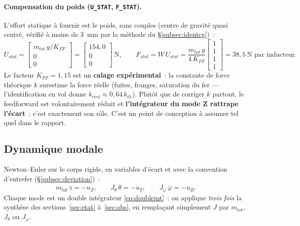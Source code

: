 \documentclass[a4paper,11pt]{article}
\begin{document}
\paragraph{Compensation du poids (\texttt{U\_STAT}, \texttt{F\_STAT}).}
L'effort statique à fournir est le poids, sans couples (centre de gravité
quasi centré, vérifié à moins de 3~mm par la méthode du
§\ref{subsec:identcg})~:
\begin{equation}
    U_{stat} = \begin{bmatrix} m_{tot}\,g / K_{FF} \\ 0 \\ 0 \end{bmatrix}
             = \begin{bmatrix} 154{,}0 \\ 0 \\ 0 \end{bmatrix}\ \text{N},
    \qquad
    F_{stat} = W\,U_{stat}
             = \frac{m_{tot}\,g}{4\,K_{FF}}\begin{bmatrix}1\\1\\1\\1\end{bmatrix}
             = 38{,}5\ \text{N par inducteur}.
\end{equation}
Le facteur $K_{FF} = 1{,}15$ est un \textbf{calage expérimental}~: la
constante de force théorique $k$ surestime la force réelle (fuites, franges,
saturation du fer --- l'identification en vol donne $k_{r\acute{e}el} \approx
0{,}64\,k_{th}$). Plutôt que de corriger $k$ partout, le feedforward est
volontairement réduit et \textbf{l'intégrateur du mode Z rattrape l'écart}~:
c'est exactement son rôle. C'est un point de conception à assumer tel quel
dans le rapport.

\subsection{Dynamique modale}

Newton--Euler sur le corps rigide, en variables d'écart et avec la convention
d'entrefer (§\ref{subsec:deviation})~:
\begin{equation}
    m_{tot}\,\ddot z = -u_Z,
    \qquad
    J_\theta\,\ddot\theta = -u_T,
    \qquad
    J_\varphi\,\ddot\varphi = -u_R .
\end{equation}
Chaque mode est un double intégrateur \eqref{eq:doubleint}~: on applique
\emph{trois fois} la synthèse des sections~\ref{sec:etat}
à~\ref{sec:obs}, en remplaçant simplement $J$ par $m_{tot}$, $J_\theta$ ou
$J_\varphi$.
\end{document}
